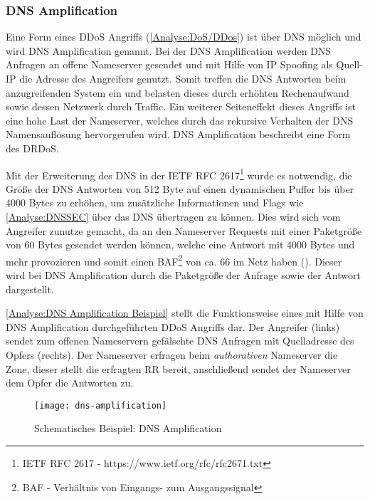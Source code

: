 \subsubsection{\ac{DNS} Amplification}
\label{Analyse:DNS Amplification}
Eine Form eines \ac{DDoS} Angriffs (\autoref{Analyse:DoS/DDos}) ist über \ac{DNS} möglich und wird \ac{DNS} Amplification genannt. Bei der \ac{DNS} Amplification werden \ac{DNS} Anfragen an offene Nameserver gesendet und mit Hilfe von \ac{IP} Spoofing als Quell-\ac{IP} die Adresse des Angreifers genutzt. Somit treffen die \ac{DNS} Antworten beim anzugreifenden System ein und belasten dieses durch erhöhten Rechenaufwand sowie dessen Netzwerk durch Traffic. Ein weiterer Seiteneffekt dieses Angriffs ist eine hohe Last der Nameserver, welches durch das rekursive Verhalten der \ac{DNS} Namensauflösung hervorgerufen wird. \ac{DNS} Amplification beschreibt eine Form des \ac{DRDoS}.

Mit der Erweiterung des \ac{DNS} in der \ac{IETF} \ac{RFC} 2617\footnote{IETF RFC 2617 - https://www.ietf.org/rfc/rfc2671.txt} wurde es notwendig, die Größe der \ac{DNS} Antworten von 512 Byte auf einen dynamischen Puffer bis über 4000 Bytes zu erhöhen, um zusätzliche Informationen und Flags wie \autoref{Analyse:DNSSEC} über das \ac{DNS} übertragen zu können. Dies wird sich vom Angreifer zunutze gemacht, da an den Nameserver Requests mit einer Paketgröße von 60 Bytes gesendet werden können, welche eine Antwort mit 4000 Bytes und mehr provozieren und somit einen \ac{BAF}\footnote{BAF - Verhältnis von Eingangs- zum Ausgangssignal} von ca. 66 im Netz haben (\cite{Ledermueller2009}). Dieser wird bei \ac{DNS} Amplification durch die Paketgröße der Anfrage sowie der Antwort dargestellt.

\autoref{Analyse:DNS Amplification Beispiel} stellt die Funktionsweise eines mit Hilfe von \ac{DNS} Amplification durchgeführten \ac{DDoS} Angriffs dar. Der Angreifer (links) sendet zum offenen Nameservern gefälschte \ac{DNS} Anfragen mit Quelladresse des Opfers (rechts). Der Nameserver erfragen beim \textit{authorativen} Nameserver die Zone, dieser stellt die erfragten \ac{RR} bereit, anschließend sendet der Nameserver dem Opfer die Antworten zu.

\begin{figure}[h]
    \centering
    \texttt{[image: dns-amplification]}
    \caption{Schematisches Beispiel: DNS Amplification}
    \label{Analyse:DNS Amplification Beispiel}
\end{figure}

